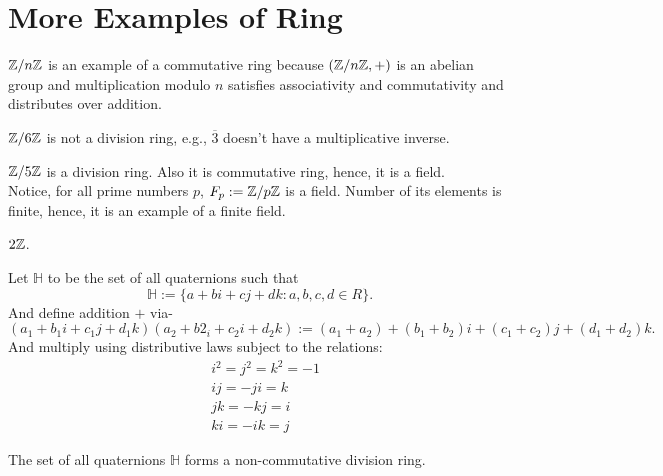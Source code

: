 \section{More Examples of Ring}
\begin{eg}
    $\mathbb{Z}/n\mathbb{Z}$ is an example of a commutative ring because $(\mathbb{Z}/n\mathbb{Z}, +)$ is an abelian group and multiplication modulo $n$ satisfies associativity and commutativity and distributes over addition.
\end{eg}
\begin{eg}
    $\mathbb{Z}/6\mathbb{Z}$ is not a division ring, e.g., $\overline{3}$ doesn't have a multiplicative inverse.
\end{eg}
\begin{eg}
$\mathbb{Z}/5\mathbb{Z}$ is a division ring. Also it is commutative ring, hence, it is a field.\\
Notice, for all prime numbers $p$, $F_p := \mathbb{Z}/p\mathbb{Z}$ is a field. Number of its elements is finite, hence, it is an example of a finite field.
\end{eg}
\begin{eg}
    $2\mathbb{Z}$.
\end{eg}
\begin{definition}[Quaternions]
    Let $\mathbb{H}$ to be the set of all quaternions such that 
    \[\mathbb{H} := \{a + bi + cj + dk: a,b,c,d \in R\}.\]
    And define addition $+$ via-
    \[(a_1 + b_1i + c_1j + d_1k)(a_2+b2_i+c_2i + d_2k) := (a_1+a_2) + (b_1 + b_2)i + (c_1+c_2)j + (d_1 + d_2)k.\]
    And multiply using distributive laws subject to the relations:
    \begin{align*}
        &i^2 = j^2 = k^2 = -1\\
        &ij = -ji = k\\
        &jk = -kj = i\\
        &ki = -ik = j
    \end{align*}
\end{definition}
\begin{eg}
The set of all quaternions $\mathbb{H}$ forms a non-commutative division ring.
\end{eg}

